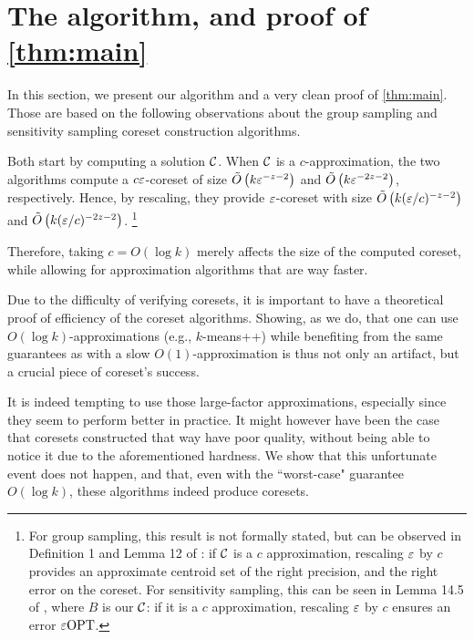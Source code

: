 \section{The algorithm, and proof of \cref{thm:main}}

In this section, we present our algorithm and a very clean proof of \cref{thm:main}. Those are based on the following observations about the group
sampling \cite{stoc21} and sensitivity sampling \cite{FeldmanL11} coreset construction algorithms.

Both start by computing a solution $\mathcal C$. When $\mathcal C$ is a $c$-approximation, the two algorithms compute a $c \varepsilon$-coreset of size $\tilde O\left(
k \varepsilon^{-z-2}\right)$ and $\tilde O\left( k \varepsilon^{-2z -2}\right)$, respectively. Hence, by rescaling, they provide $\varepsilon$-coreset with size $\tilde O\left(
k (\varepsilon/c)^{-z-2}\right)$ and $\tilde O\left( k (\varepsilon/c)^{-2z-2}\right)$. \footnote{For group sampling, this result is not formally stated, but can be observed in Definition 1 and Lemma 12 of \cite{stoc21}: if $\mathcal C$ is a $c$ approximation, rescaling $\varepsilon$ by $c$ provides an approximate centroid set of the right precision, and the right error on the coreset. For sensitivity sampling, this can be seen in Lemma 14.5 of \cite{FLArxiv}, where $B$ is our $\mathcal C$: if it is a $c$ approximation, rescaling $\varepsilon$ by $c$ ensures an error $\varepsilon \text{OPT}$.} 

Therefore, taking $c = O(\log k)$ merely affects the size of the computed coreset, while allowing for approximation algorithms that are way faster.

Due to the difficulty of verifying coresets, it is important to have a theoretical proof of efficiency of the coreset algorithms.  Showing, as we do, that one can use $O(\log k)$-approximations (e.g., $k$-means++) while benefiting from the same
guarantees as with a slow $O(1)$-approximation is thus not only an artifact, but a crucial piece of coreset's success. 

It is indeed tempting to use those large-factor approximations, especially since they seem to perform better in practice. 
It might however have been the case that coresets constructed that way have poor quality, without being able to notice it due to the aforementioned hardness. 
We show that this unfortunate event does not happen, and that, even with the ``worst-case" guarantee $O(\log k)$, these algorithms indeed produce coresets.

